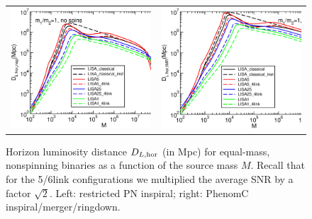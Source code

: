 \documentclass{iopart}
\begin{document}
%
\begin{figure}[H]
\begin{center}
\begin{tabular}{cc}
\includegraphics[scale=0.33,clip=true]{FigEmanuele/DLinsp.eps}
&\includegraphics[scale=0.33,clip=true]{FigEmanuele/DLIMR.eps}\\
\end{tabular}
\caption{\label{fig:DL} Horizon luminosity distance $D_{L, {\rm hor}}$ (in
  Mpc) for equal-mass, nonspinning binaries as a function of the source mass
  $M$. Recall that for the 5/6link configurations we multiplied the average
  SNR by a factor $\sqrt{2}$. Left: restricted PN inspiral; right: {\sc
    PhenomC} inspiral/merger/ringdown.}
\end{center}
\end{figure}
%
\end{document}
